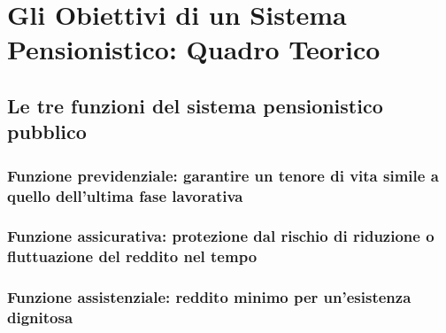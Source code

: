 \chapter{Gli Obiettivi di un Sistema Pensionistico: Quadro Teorico}


\section{Le tre funzioni del sistema pensionistico pubblico}

    \subsection{Funzione previdenziale: garantire un tenore di vita
                simile a quello dell'ultima fase lavorativa}
    \subsection{Funzione assicurativa: protezione dal rischio
                di riduzione o fluttuazione del reddito nel tempo}
    \subsection{Funzione assistenziale: reddito minimo
                per un'esistenza dignitosa}
